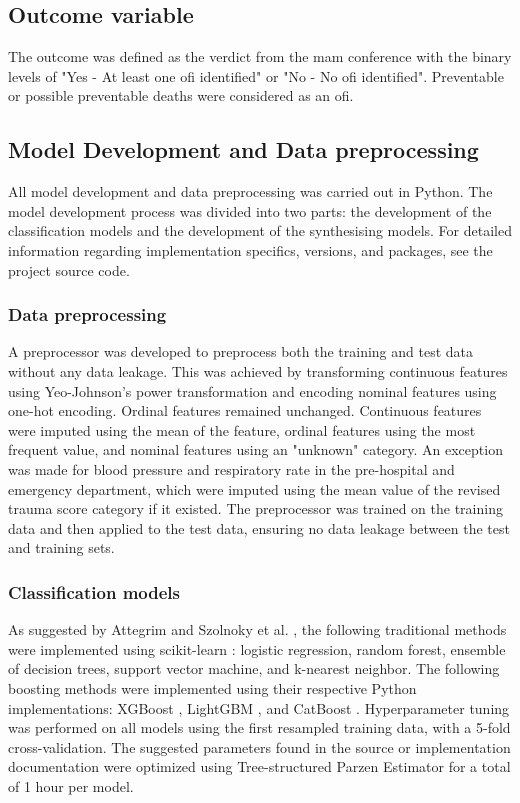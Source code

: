 \documentclass[12pt, letterpaper]{article}
\begin{document}
\subsection{Outcome variable}
The outcome was defined as the verdict from the \acrshort{mam} conference with the binary levels of "Yes - At least one \acrshort{ofi} identified" or "No - No \acrshort{ofi} identified". Preventable or possible preventable deaths were considered as an \acrshort{ofi}.

\subsection{Model Development and Data preprocessing}
All model development and data preprocessing was carried out in Python. The model development process was divided into two parts: the development of the classification models and the development of the synthesising models. For detailed information regarding implementation specifics, versions, and packages, see the project source code.

\subsubsection*{Data preprocessing}
A preprocessor was developed to preprocess both the training and test data without any data leakage. This was achieved by transforming continuous features using Yeo-Johnson's power transformation \cite{yeo_new_2000} and encoding nominal features using one-hot encoding. Ordinal features remained unchanged. Continuous features were imputed using the mean of the feature, ordinal features using the most frequent value, and nominal features using an "unknown" category. An exception was made for blood pressure and respiratory rate in the pre-hospital and emergency department, which were imputed using the mean value of the revised trauma score category \cite{ringdal_utstein_2008} if it existed. The preprocessor was trained on the training data and then applied to the test data, ensuring no data leakage between the test and training sets.

\subsubsection*{Classification models}
As suggested by Attegrim and Szolnoky et al. \cite{attergrim_predicting_2023}, the following traditional methods were implemented using scikit-learn \cite{pedregosa_scikit_2011}: logistic regression, random forest, ensemble of decision trees, support vector machine, and k-nearest neighbor. The following boosting methods were implemented using their respective Python implementations: XGBoost \cite{chen_xgboost_2016}, LightGBM \cite{ke_lightgbm_2017}, and CatBoost \cite{prokhorenkova_catboost_2018}. Hyperparameter tuning was performed on all models using the first resampled training data, with a 5-fold cross-validation. The suggested parameters found in the source or implementation documentation were optimized using Tree-structured Parzen Estimator \cite{bergstra_algorithms_2011} for a total of 1 hour per model.
\end{document}
